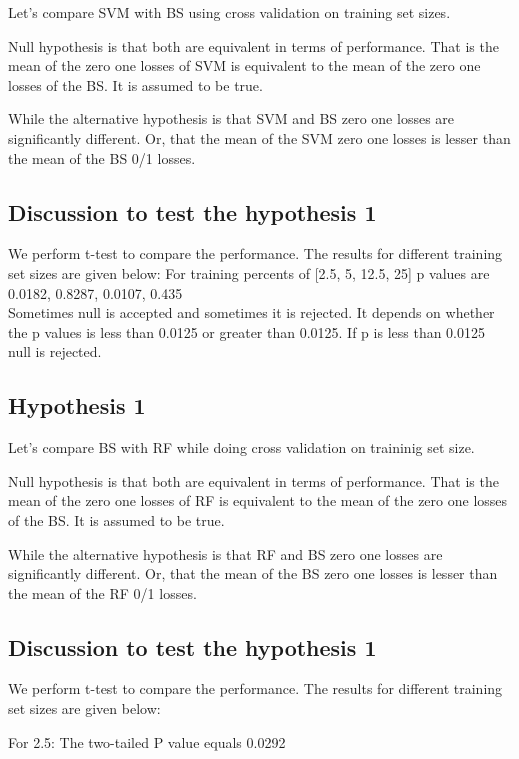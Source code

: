 \documentclass[12pt]{article}
\begin{document}
Let's compare SVM with BS using cross validation on training set sizes.

Null hypothesis is that both are equivalent in terms of performance. That is the mean of the
zero one losses of SVM is equivalent to the mean of the zero one losses of the BS. It is assumed
to be true. 

While the alternative hypothesis is that SVM and BS zero one losses are significantly different.
Or, that the mean of the SVM zero one losses is lesser than the mean of the BS 0/1 losses.

\subsection{Discussion to test the hypothesis 1}

We perform t-test to compare the performance. The results for different training set sizes are given below:
For training percents of [2.5, 5, 12.5, 25] p values are 0.0182, 0.8287, 0.0107, 0.435   \\

Sometimes null is accepted and sometimes it is rejected. It depends on whether the p values is 
less than 0.0125 or greater than 0.0125. If p is less than 0.0125 null is rejected.

\subsection{Hypothesis 1}

Let's compare BS with RF while doing cross validation on traininig set size.

Null hypothesis is that both are equivalent in terms of performance. That is the mean of the
zero one losses of RF is equivalent to the mean of the zero one losses of the BS. It is assumed
to be true. 

While the alternative hypothesis is that RF and BS zero one losses are significantly different.
Or, that the mean of the BS zero one losses is lesser than the mean of the RF 0/1 losses.

\subsection{Discussion to test the hypothesis 1}

We perform t-test to compare the performance. The results for different training set sizes are given below:

For 2.5:
  The two-tailed P value equals 0.0292  \\
\end{document}
